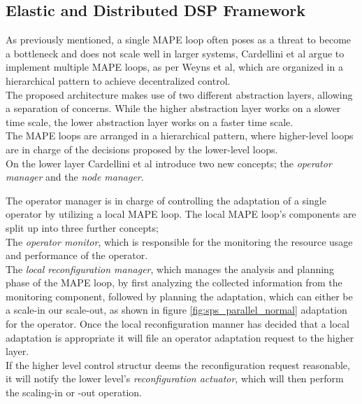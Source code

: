         \subsection{Elastic and Distributed DSP Framework}
        \label{sec:edf}
        As previously mentioned, a single MAPE loop often poses as a threat to become a bottleneck and does not scale well in larger systems\cite{cardellini}\cite{Cheng:2009:SES:1573856.1573858},
        Cardellini et al argue to implement multiple MAPE loops, as per Weyns et al\cite{Weyns2013}, which are organized in a hierarchical pattern to achieve decentralized control.
        \\
        The proposed architecture makes use of two different abstraction layers, allowing a separation of concerns. 
        While the higher abstraction layer works on a slower time scale, the lower abstraction layer works on a faster time scale.
        \\
        The MAPE loops are arranged in a hierarchical pattern, where higher-level loops are in charge of the decisions proposed by the lower-level loops.
        \\
        On the lower layer Cardellini et al introduce two new concepts; the \textit{operator manager} and the \textit{node manager}.

        \quad The operator manager is in charge of controlling the adaptation of a single operator by utilizing a local MAPE loop.
        The local MAPE loop's components are split up into three further concepts;
        \\
        The \textit{operator monitor}, which is responsible for the monitoring the resource usage and performance of the operator.
        \\
        The \textit{local reconfiguration manager}, which manages the analysis and planning phase of the MAPE loop, by first analyzing the collected information 
        from the monitoring component, followed by planning the adaptation, which can either be a scale-in our scale-out, 
        as shown in figure \ref{fig:sps_parallel_normal} adaptation for the operator.
        Once the local reconfiguration manner has decided that a local adaptation is appropriate it will file an operator adaptation request to the higher layer.
        \\
        If the higher level control structur deems the reconfiguration request reasonable, it will notify the lower level's \textit{reconfiguration actuator}, which will then 
        perform the scaling-in or -out operation.


